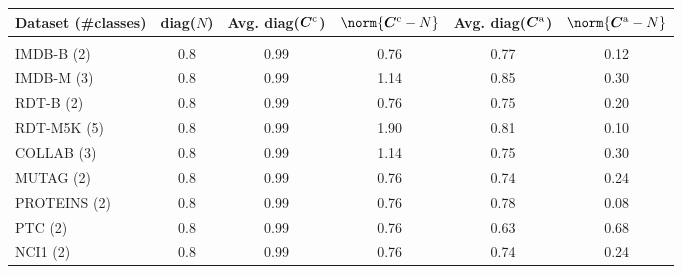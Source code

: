 \documentclass[portrait,final,archD,fontscale=0.477]{baposter}
\begin{document}
\begin{poster}
{\hspace{5em}
\begin{tabular}{l|ccccc}
\bf{Dataset} (\#classes) & diag($N$) & Avg. diag(${\bm{C}}^{\text{c}}$) & $\norm{\mC^{\text{c}}-N}$ & Avg. diag(${\bm{C}}^{\text{a}}$) & $\norm{\mC^{\text{a}}-N}$ \\
\hline \\
IMDB-B   (2) & 0.8  & 0.99   & 0.76  & 0.77 & 0.12\\
IMDB-M   (3) & 0.8  & 0.99   & 1.14  & 0.85 & 0.30\\
RDT-B    (2) & 0.8  & 0.99   & 0.76  & 0.75 & 0.20\\
RDT-M5K  (5) & 0.8  & 0.99   & 1.90  & 0.81 & 0.10\\
COLLAB   (3) & 0.8  & 0.99   & 1.14  & 0.75 & 0.30\\
MUTAG    (2) & 0.8  & 0.99   & 0.76  & 0.74 & 0.24\\
PROTEINS (2) & 0.8  & 0.99   & 0.76  & 0.78 & 0.08\\
PTC      (2) & 0.8  & 0.99   & 0.76  & 0.63 & 0.68\\
NCI1     (2) & 0.8  & 0.99   & 0.76  & 0.74 & 0.24\\
\end{tabular}
\vspace{1em}
}

\end{poster}
\end{document}
